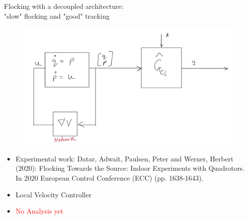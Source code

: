 \documentclass{beamer}
\begin{document}
\begin{frame}{Flocking with a decoupled architecture:\\ "slow" flocking and "good" tracking}
	\begin{figure}
		\includegraphics[height=0.45\textheight]{figures/Flocking_decoupled.jpg}
	\end{figure}
	\begin{itemize}		
		\item Experimental work: Datar, Adwait, Paulsen, Peter and Werner, Herbert (2020): Flocking Towards the Source: Indoor Experiments with Quadrotors. In 2020 European Control Conference (ECC) (pp. 1638-1643).
		\item Local Velocity Controller
		\item \textcolor{red}{No Analysis yet}
	\end{itemize}
\end{frame}
\end{document}
